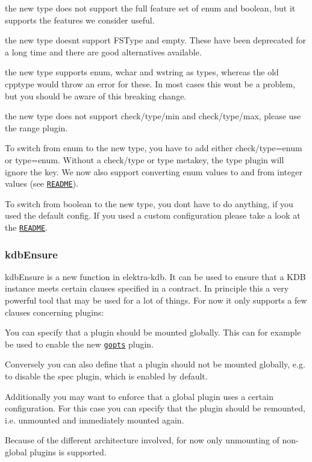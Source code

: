 \begin{DoxyItemize}
\item the new {\ttfamily type} does not support the full feature set of {\ttfamily enum} and {\ttfamily boolean}, but it supports the features we consider useful.
\item the new {\ttfamily type} doesn\textquotesingle{}t support {\ttfamily F\+S\+Type} and {\ttfamily empty}. These have been deprecated for a long time and there are good alternatives available.
\item the new {\ttfamily type} supports {\ttfamily enum}, {\ttfamily wchar} and {\ttfamily wstring} as types, whereas the old {\ttfamily cpptype} would throw an error for these. In most cases this won\textquotesingle{}t be a problem, but you should be aware of this breaking change.
\item the new {\ttfamily type} does not support {\ttfamily check/type/min} and {\ttfamily check/type/max}, please use the {\ttfamily range} plugin.
\end{DoxyItemize}

To switch from {\ttfamily enum} to the new {\ttfamily type}, you have to add either {\ttfamily check/type=enum} or {\ttfamily type=enum}. Without a {\ttfamily check/type} or {\ttfamily type} metakey, the {\ttfamily type} plugin will ignore the key. We now also support converting enum values to and from integer values (see \href{https://www.libelektra.org/plugins/type}{\tt R\+E\+A\+D\+ME}).

To switch from {\ttfamily boolean} to the new {\ttfamily type}, you don\textquotesingle{}t have to do anything, if you used the default config. If you used a custom configuration please take a look at the \href{https://www.libelektra.org/plugins/type}{\tt R\+E\+A\+D\+ME}.

\subsubsection*{kdb\+Ensure}

{\ttfamily kdb\+Ensure} is a new function in {\ttfamily elektra-\/kdb}. It can be used to ensure that a K\+DB instance meets certain clauses specified in a contract. In principle this a very powerful tool that may be used for a lot of things. For now it only supports a few clauses concerning plugins\+:


\begin{DoxyItemize}
\item You can specify that a plugin should be mounted globally. This can for example be used to enable the new \href{#gopts}{\tt gopts} plugin.
\item Conversely you can also define that a plugin should not be mounted globally, e.\+g. to disable the {\ttfamily spec} plugin, which is enabled by default.
\item Additionally you may want to enforce that a global plugin uses a certain configuration. For this case you can specify that the plugin should be remounted, i.\+e. unmounted and immediately mounted again.
\item Because of the different architecture involved, for now only unmounting of non-\/global plugins is supported.
\end{DoxyItemize}

